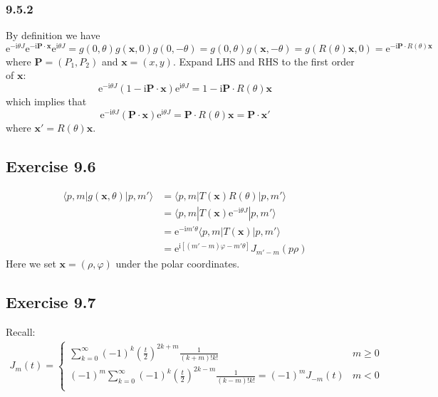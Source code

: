 \documentclass[]{ctexart}
\begin{document}
\subsubsection*{9.5.2}
By definition we have 
\begin{equation*}
\mathrm{e}^{-\mathrm{i}\theta J}\mathrm{e}^{-\mathrm{i}\mathbf P\cdot\mathbf x}\mathrm{e}^{\mathrm{i}\theta J}=g(0,\theta)g(\mathbf x,0)g(0,-\theta)=g(0,\theta)g(\mathbf x,-\theta)=g(R(\theta)\mathbf x,0)=\mathrm{e}^{-\mathrm{i}\mathbf P\cdot R(\theta)\mathbf x}
\end{equation*}
where $\mathbf P=(P_1,P_2)$ and $\mathbf x=(x,y)$. Expand LHS and RHS to the first order of $\mathbf x$: 
\begin{equation*}
\mathrm{e}^{-\mathrm{i}\theta J}(1-\mathrm{i}\mathbf P\cdot\mathbf x)\mathrm{e}^{\mathrm{i}\theta J}=1-\mathrm{i}\mathbf P\cdot R(\theta)\mathbf x
\end{equation*}
which implies that 
\begin{equation*}
\mathrm{e}^{-\mathrm{i}\theta J}(\mathbf P\cdot\mathbf x)\mathrm{e}^{\mathrm{i}\theta J}=\mathbf P\cdot R(\theta)\mathbf x=\mathbf P\cdot\mathbf x'
\end{equation*}
where $\mathbf x'=R(\theta)\mathbf x$. 
\subsection{Exercise 9.6}
	\begin{align*}
		\langle p,m|g(\mathbf x,\theta)|p,m'\rangle&=\langle p,m|T(\mathbf x)R(\theta)|p,m'\rangle\\
		&=\langle p,m|T(\mathbf x)\mathrm{e}^{-\mathrm{i}\theta J}|p,m'\rangle\\
		&=\mathrm{e}^{-\mathrm{i}m'\theta}\langle p,m|T(\mathbf x)|p,m'\rangle\\
		&=\mathrm{e}^{\mathrm{i}[(m'-m)\varphi-m'\theta]}J_{m'-m}(p\rho)
	\end{align*}
	Here we set $\mathbf x=(\rho,\varphi)$ under the polar coordinates. 

\subsection{Exercise 9.7}
	Recall:
		\begin{equation*}
		\begin{aligned}
			J_m(t)=
			\begin{cases}
				\sum_{k=0}^{\infty}(-1)^k\left(\frac{t}{2}\right)^{2k+m}\frac{1}{(k+m)!k!}& m\geq 0\\
				(-1)^{m}\sum_{k=0}^{\infty}(-1)^k\left(\frac{t}{2}\right)^{2k-m}\frac{1}{(k-m)!k!}=(-1)^{m}J_{-m}(t)&m<0\\
			\end{cases}
		\end{aligned}
		\end{equation*}
	
\end{document}
